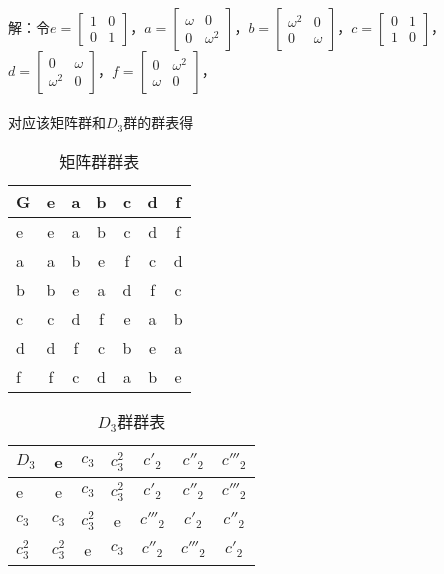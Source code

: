 \documentclass[12pt]{article}
\numberwithin{equation}{section}	 %
\begin{document}
\begin{spacing}{1.5}
~\\
解：令$e =\begin{bmatrix} 1 & 0 \\ 0 & 1 \end{bmatrix}$，$a =\begin{bmatrix} \omega & 0 \\ 0 & \omega^{2} \end{bmatrix}$，$b =\begin{bmatrix} \omega^{2} & 0 \\ 0 & \omega \end{bmatrix}$，$c =\begin{bmatrix} 0 & 1 \\ 1 & 0 \end{bmatrix}$，$d =\begin{bmatrix} 0 & \omega \\ \omega^{2} & 0 \end{bmatrix}$，$f =\begin{bmatrix} 0 & \omega^{2} \\ \omega & 0 \end{bmatrix}$，\\
~\\
对应该矩阵群和$D_{3}$群的群表得 \\
\begin{center}
\begin{longtable}{l|cccccc}
\caption{矩阵群群表}\\
	G & e & a & b & c & d & f \\
	\hline
	e & e & a & b & c & d & f \\
	a & a & b & e & f & c & d \\
	b & b & e & a & d & f & c \\
	c & c & d & f & e & a & b \\
	d & d & f & c & b & e & a \\
	f & f & c & d & a & b & e \\
\end{longtable}
\begin{longtable}{l|cccccc}
\caption{$D_{3}$群群表}\\
	$D_{3}$ & e & $c_{3}$ & $c_{3}^{2}$ & $c'_{2}$ & $c''_{2}$ & $c'''_{2}$ \\
	\hline
	e & e & $c_{3}$ & $c_{3}^{2}$ & $c'_{2}$ & $c''_{2}$ & $c'''_{2}$ \\
	$c_{3}$ & $c_{3}$ & $c_{3}^{2}$ & e & $c'''_{2}$ & $c'_{2}$ & $c''_{2}$ \\
	$c_{3}^{2}$ & $c_{3}^{2}$ & e & $c_{3}$ & $c''_{2}$ & $c'''_{2}$ & $c'_{2}$ \\

\end{longtable}
\end{center}
\end{spacing}
\end{document}
